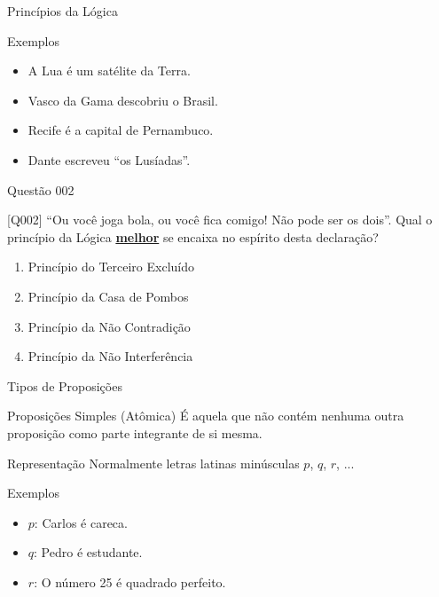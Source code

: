 \documentclass[xcolor=dvipsnames,table]{beamer}
\begin{document}
	\begin{frame}{Princípios da Lógica}
		\begin{block}{Exemplos}
			\begin{itemize}[label=-] 
				\item A Lua é um satélite da Terra. \pause {\color{blue} [Verdadeira]}
				\item Vasco da Gama descobriu o Brasil. \pause {\color{red} [Falsa]}
				\item Recife é a capital de Pernambuco. \pause {\color{blue} [Verdadeira]}
				\item Dante escreveu ``os Lusíadas''. \pause {\color{red} [Falsa]}
			\end{itemize}
		\end{block}
	\end{frame}

	\begin{frame}{Questão 002}		
		\begin{block}{[Q002]}
			``Ou você joga bola, ou você fica comigo! Não pode ser os dois''. Qual o princípio da Lógica \underline{\bf melhor} se encaixa no espírito desta declaração? 
		\end{block}
		\begin{enumerate}[label=(\Alph*)]
			\item Princípio do Terceiro Excluído
			\item Princípio da Casa de Pombos
			\item Princípio da Não Contradição
			\item Princípio da Não Interferência
		\end{enumerate}
	\end{frame}

	\begin{frame}{Tipos de Proposições}
		\begin{block}{Proposições Simples (Atômica)}
			É aquela que não contém nenhuma outra proposição como parte integrante de si mesma.
		\end{block} \pause
		\begin{block}{Representação}
			Normalmente letras latinas minúsculas $p$, $q$, $r$, ...
		\end{block} \pause
		\begin{exampleblock}{Exemplos}
			\begin{itemize}[label=-]
				\item $p$: Carlos é careca.
				\item $q$: Pedro é estudante.
				\item $r$: O número 25 é quadrado perfeito.
			\end{itemize}
		\end{exampleblock}
	\end{frame}
\end{document}
